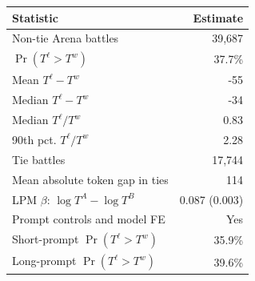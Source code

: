 \begin{tabular}{l r}
\toprule
Statistic & Estimate \\
\midrule
Non-tie Arena battles & 39,687 \\
$\Pr(T^\ell>T^w)$ & 37.7\% \\
Mean $T^\ell-T^w$ & -55 \\
Median $T^\ell-T^w$ & -34 \\
Median $T^\ell/T^w$ & 0.83 \\
90th pct. $T^\ell/T^w$ & 2.28 \\
Tie battles & 17,744 \\
Mean absolute token gap in ties & 114 \\
LPM $\beta$: $\log T^A-\log T^B$ & 0.087 (0.003) \\
Prompt controls and model FE & Yes \\
Short-prompt $\Pr(T^\ell>T^w)$ & 35.9\% \\
Long-prompt $\Pr(T^\ell>T^w)$ & 39.6\% \\
\bottomrule
\end{tabular}
